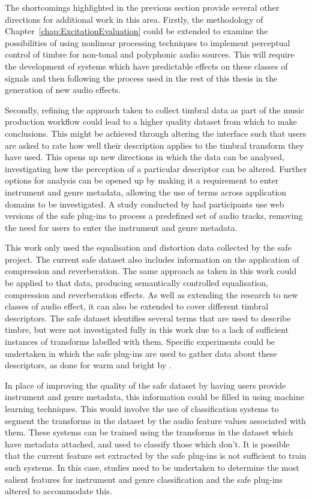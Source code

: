 	The shortcomings highlighted in the previous section provide several other directions for additional work in this
	area. Firstly, the methodology of Chapter~\ref{chap:ExcitationEvaluation} could be extended to examine the
	possibilities of using nonlinear processing techniques to implement perceptual control of timbre for non-tonal and
	polyphonic audio sources. This will require the development of systems which have predictable effects on these
	classes of signals and then following the process used in the rest of this thesis in the generation of new audio
	effects.
	
	Secondly, refining the approach taken to collect timbral data as part of the music production workflow could lead to
	a higher quality dataset from which to make conclusions. This might be achieved through altering the interface such
	that users are asked to rate how well their description applies to the timbral transform they have used. This opens
	up new directions in which the data can be analysed, investigating how the perception of a particular descriptor can
	be altered. Further options for analysis can be opened up by making it a requirement to enter instrument and genre
	metadata, allowing the use of terms across application domains to be investigated. A study conducted by
	\citet{stasis2017audio} had participants use web versions of the \acrshort{safe} plug-ins to process a predefined
	set of audio tracks, removing the need for users to enter the instrument and genre metadata.

	This work only used the equalisation and distortion data collected by the \acrshort{safe} project. The current
	\acrshort{safe} dataset also includes information on the application of compression and reverberation. The same
	approach as taken in this work could be applied to that data, producing semantically controlled equalisation,
	compression and reverberation effects. As well as extending the research to new classes of audio effect, it can also
	be extended to cover different timbral descriptors. The \acrshort{safe} dataset identifies several terms that are
	used to describe timbre, but were not investigated fully in this work due to a lack of sufficient instances of
	transforms labelled with them. Specific experiments could be undertaken in which the \acrshort{safe} plug-ins are
	used to gather data about these descriptors, as done for warm and bright by \citet{stasis2015a}.

	In place of improving the quality of the \acrshort{safe} dataset by having users provide instrument and genre
	metadata, this information could be filled in using machine learning techniques. This would involve the use of
	classification systems to segment the transforms in the dataset by the audio feature values associated with them.
	These systems can be trained using the transforms in the dataset which have metadata attached, and used to classify
	those which don't.  It is possible that the current feature set extracted by the \acrshort{safe} plug-ins is not
	sufficient to train such systems.  In this case, studies need to be undertaken to determine the most salient
	features for instrument and genre classification and the \acrshort{safe} plug-ins altered to accommodate this.

